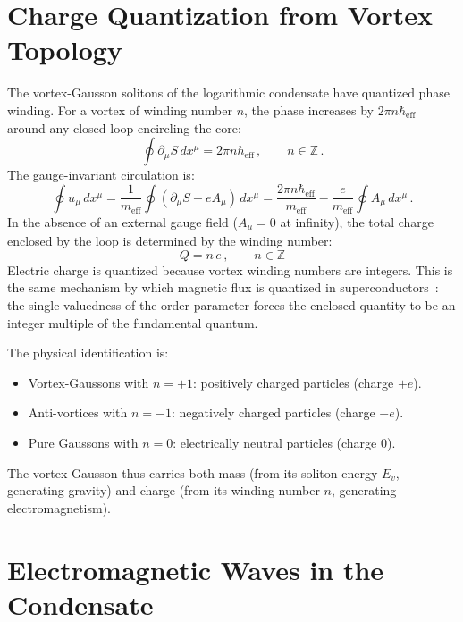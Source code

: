 \documentclass[12pt, a4paper]{article}
\newcommand{\meff}{m_{\mathrm{eff}}}
\newcommand{\heff}{\hbar_{\mathrm{eff}}}
\begin{document}
\section{Charge Quantization from Vortex Topology}
\label{sec:charge}

The vortex-Gausson solitons of the logarithmic condensate have quantized phase winding. For a vortex of winding number $n$, the phase increases by $2\pi n\heff$ around any closed loop encircling the core:
\begin{equation}
    \oint \partial_\mu S\,dx^\mu = 2\pi n\heff\,,
    \qquad n \in \mathbb{Z}\,.
\label{eq:winding}
\end{equation}
The gauge-invariant circulation is:
\begin{equation}
    \oint u_\mu\,dx^\mu
    = \frac{1}{\meff}\oint(\partial_\mu S
    - eA_\mu)\,dx^\mu
    = \frac{2\pi n\heff}{\meff}
    - \frac{e}{\meff}\oint A_\mu\,dx^\mu\,.
\label{eq:circulation}
\end{equation}
In the absence of an external gauge field ($A_\mu = 0$ at infinity), the total charge enclosed by the loop is determined by the winding number:
\begin{equation}
    \boxed{\;Q = n\,e\,, \qquad n \in \mathbb{Z}\;}
\label{eq:charge_quantized}
\end{equation}
Electric charge is quantized because vortex winding numbers are integers. This is the same mechanism by which magnetic flux is quantized in superconductors~\cite{london_1950}: the single-valuedness of the order parameter forces the enclosed quantity to be an integer multiple of the fundamental quantum.

The physical identification is:
\begin{itemize}
\item Vortex-Gaussons with $n = +1$: positively
charged particles (charge $+e$).
\item Anti-vortices with $n = -1$: negatively charged
particles (charge $-e$).
\item Pure Gaussons with $n = 0$: electrically neutral
particles (charge $0$).
\end{itemize}
The vortex-Gausson thus carries both mass (from its soliton energy $E_v$, generating gravity) and charge (from its winding number $n$, generating electromagnetism).


\section{Electromagnetic Waves in the Condensate}
\label{sec:em_waves}
\end{document}
